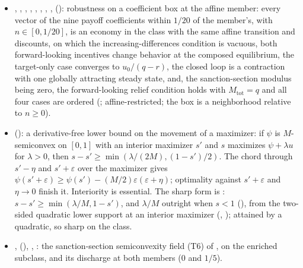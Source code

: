 \begin{itemize}[leftmargin=1.4em,itemsep=1pt]
\item {}, , , , , , , ,  (): robustness on a coefficient box at the affine member: every vector of the nine payoff coefficients within $1/20$ of the member's, with $n\in[0,1/20]$, is an economy in the class with the same affine transition and discounts, on which the increasing-differences condition is vacuous, both forward-looking incentives change behavior at the composed equilibrium, the target-only case converges to $u_0/(q-r)$, the closed loop is a contraction with one globally attracting steady state, and, the sanction-section modulus being zero, the forward-looking relief condition holds with $M_{\mathrm{tot}}=q$ and all four cases are ordered (; affine-restricted; the box is a neighborhood relative to $n\ge0$).
\item {} (): a derivative-free lower bound on the movement of a maximizer: if $\psi$ is $M$-semiconvex on $[0,1]$ with an interior maximizer $s'$ and $s$ maximizes $\psi+\lambda u$ for $\lambda>0$, then $s-s'\ge\min(\lambda/(2M),(1-s')/2)$. The chord through $s'-\eta$ and $s'+\varepsilon$ over the maximizer gives $\psi(s'+\varepsilon)\ge\psi(s')-(M/2)\varepsilon(\varepsilon+\eta)$; optimality against $s'+\varepsilon$ and $\eta\to0$ finish it. Interiority is essential. The sharp form is : $s-s'\ge\min(\lambda/M,1-s')$, and $\lambda/M$ outright when $s<1$ (), from the two-sided quadratic lower support at an interior maximizer (, ); attained by a quadratic, so sharp on the class.
\item {},  (), , : the sanction-section semiconvexity field (T6) of , on the enriched subclass, and its discharge at both members ($0$ and $1/5$).

\end{itemize}
